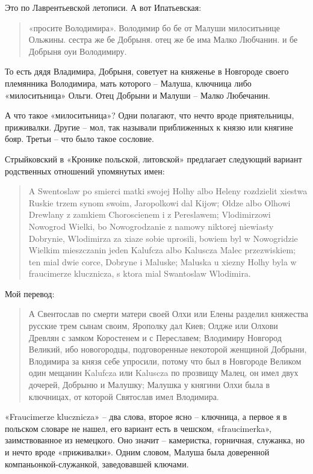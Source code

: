 Это по Лаврентьевской летописи. А вот Ипатьевская:

\begin{quotation}
«просите Володимира». Володимир бо бе от Малуши милоситьнице Ольжины. сестра же бе Добрыня. отец же бе има Малко Любчанин. и бе Добрыня оуи Володимиру.
\end{quotation}

То есть дядя Владимира, Добрыня, советует на княженье в Новгороде своего племянника Володимира, мать которого – Малуша, ключница либо «милоситьница» Ольги. Отец Добрыни и Малуши – Малко Любечанин.

А что такое «милоситьница»? Одни полагают, что нечто вроде приятельницы, приживалки. Другие – мол, так называли приближенных к князю или княгине бояр. Третьи – что было такое сословие.

Стрыйковский в «Кронике польской, литовской» предлагает следующий вариант родственных отношений упомянутых имен:

\begin{otherlanguage}{polish}
\begin{quotation}
A Swentoslaw po smierci matki swojej Holhy albo Heleny rozdzielit xiestwa Ruskie trzem synom swoim, Jaropolkowi dal Kijow; Oldze albo Olhowi Drewlany z zamkiem Choroscienem i z Pereslaw\-em; Vlodimirzowi Nowogrod Wielki, bo Nowogrod\-zanie z namowy niktorej niewiasty Dobrynie, Wlodi\-mirza za xiaze sobie uprosili, bowiem byl w Nowog\-ridzie Wielkim mieszczanin jeden Kalufcza albo Kaluscza Malec przezwiskiem; ten mial dwie corce, Dobryne i Maluske; Maluska u xiezny Holhy byla w fraucim\-erze klucznicza, s ktora mial Swantoslaw Wlodimi\-ra.
\end{quotation}
\end{otherlanguage}

Мой перевод:

\begin{quotation}
А Свентослав по смерти матери своей Олхи или Елены разделил княжества русские трем сынам своим, Ярополку дал Киев; Олдже или Олхови Древлян с замком Коростенем и с Переславем; Влодимиру Новгород Великий, ибо новогородцы, подговоренные некоторой женщиной Добрыни, Влодимира за князя себе упросили, потому что был в Новгороде Великом один мещанин Kalufcza или Kaluscza по прозвищу Малец, он имел двух дочерей, Добрыню и Малушку; Малушка у княгини Олхи была в ключницах, от которой Святослав имел Влодимира.
\end{quotation}

«Fraucimerze klucznicza» – два слова, второе ясно – ключница, а первое я в польском словаре не нашел, его вариант есть в чешском, «fraucimerka», заимствованное из немецкого. Оно значит – камеристка, горничная, служанка, но и нечто вроде «приживалки». Одним словом, Малуша была доверенной компаньонкой-служанкой, заведовавшей ключами.

